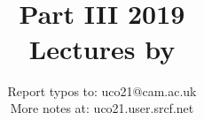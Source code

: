 \newcommand{\bdelta}{\delta\hspace*{-0.2em}\bar{}\hspace*{0.2em}}

\newcommand*\pdd[1]{\mathop{\mathcal{D} #1}}

\newcommand{\normalorder}[1]{\mathop{:}\nolimits\!#1\!\mathop{:}\nolimits}

\newcommand{\suchthat}{\ifnum\currentgrouptype=16 \;\middle|\;\else\mid\fi}

\author{Report typos to: uco21@cam.ac.uk\\More notes at: uco21.user.srcf.net}
\title{{\Huge \coursetitle{}}\\
Part III \term{} 2019\\
Lectures by \lecturer{}}
